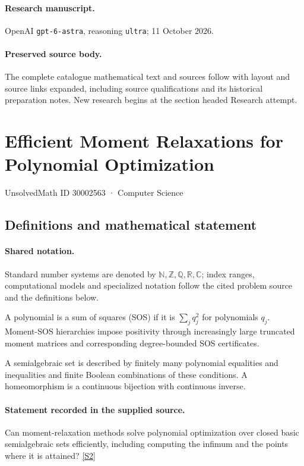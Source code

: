 \documentclass[11pt]{article}
\begin{document}
\paragraph{Research manuscript.} OpenAI \texttt{gpt-6-astra}, reasoning \texttt{ultra}; 11 October 2026.
\paragraph{Preserved source body.} The complete catalogue mathematical text and sources follow with layout and source links expanded, including source qualifications and its historical preparation notes. New research begins at the section headed Research attempt.

\section{Efficient Moment Relaxations for Polynomial Optimization}\label{30002563}
{\small UnsolvedMath ID 30002563 · Computer Science}
\subsection{Definitions and mathematical statement}

\paragraph{Shared notation.}Standard number systems are denoted by $\mathbb N,\mathbb Z,\mathbb Q,\mathbb R,\mathbb C$; index ranges, computational models and specialized notation follow the cited problem source and the definitions below.


A polynomial is a sum of squares (SOS) if it is $\sum_j q_j^2$ for polynomials $q_j$. Moment-SOS hierarchies impose positivity through increasingly large truncated moment matrices and corresponding degree-bounded SOS certificates.

A semialgebraic set is described by finitely many polynomial equalities and inequalities and finite Boolean combinations of these conditions. A homeomorphism is a continuous bijection with continuous inverse.
\paragraph{Statement recorded in the supplied source.}
Can moment-relaxation methods solve polynomial optimization over closed basic semialgebraic sets efficiently, including computing the infimum and the points where it is attained? \href{https://doi.org/10.4171/owr/2014/17}{[S2]}
\end{document}

